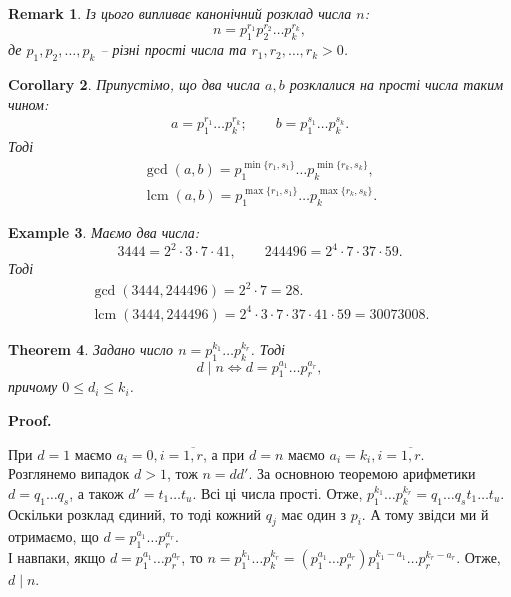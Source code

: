 \documentclass[a4paper, 10pt]{article}
\makeatletter
\theoremstyle{theoremdd}
\newtheorem{theorem}{Theorem}[subsection]
\theoremstyle{theoremdd}
\theoremstyle{theoremdd}
\theoremstyle{theoremdd}
\newtheorem{example}[theorem]{Example}
\theoremstyle{theoremdd}
\theoremstyle{theoremdd}
\newtheorem{remark}[theorem]{Remark}
\theoremstyle{theoremdd}
\theoremstyle{theoremdd}
\newtheorem{corollary}[theorem]{Corollary}
\renewenvironment{proof}[1][Proof.\\]{\par
\pushQED{\hfill \qed}%
\normalfont \topsep6\p@\@plus6\p@\relax
\trivlist
\item\relax
{\bfseries
#1\@addpunct{.}}\hspace\labelsep\ignorespaces
}{%
\popQED\endtrivlist\@endpefalse
}
\DeclareMathOperator{\lcm}{lcm}
\makeatother
\begin{document}
\begin{remark}
Із цього випливає канонічний розклад числа $n$:
\begin{equation*}
n = p_1^{r_1} p_2^{r_2} \dots p_k^{r_k},
\end{equation*}
де $p_1, p_2, \dots, p_k$ -- різні прості числа та $r_1,r_2,\dots,r_k > 0$.
\end{remark}

\begin{corollary}
Припустімо, що два числа $a,b$ розклалися на прості числа таким чином:
\begin{align*}
a = p_1^{r_1} \dots p_k^{r_k}; \qquad b = p_1^{s_1} \dots p_k^{s_k}.
\end{align*}
Тоді 
\begin{gather*}
\gcd (a,b) = p_1^{\min \{r_1,s_1\}} \dots p_k^{\min \{r_k,s_k\}}, \\
\lcm(a,b) = p_1^{\max \{r_1,s_1\}} \dots p_k^{\max \{r_k,s_k\}}.
\end{gather*}
\end{corollary}

\begin{example}
Маємо два числа:
\[
3444 = 2^2 \cdot 3 \cdot 7 \cdot 41, \qquad 244496 = 2^4 \cdot 7 \cdot 37 \cdot 59.
\]
Тоді
\begin{gather*}
\gcd(3444, 244496) = 2^2 \cdot 7 = 28.\\
\lcm(3444, 244496) = 2^4 \cdot 3 \cdot 7 \cdot 37 \cdot 41 \cdot 59 = 30073008.
\end{gather*}
\end{example}

\begin{theorem}
Задано число $n = p_1^{k_1} \dots p_k^{k_r}$. Тоді
\[
d \mid n \iff d = p_1^{a_1} \dots p_r^{a_r},
\] причому $0 \leq d_i \leq k_i$.
\end{theorem}

\begin{proof}
При $d = 1$ маємо $a_i = 0, i = \overline{1,r}$, а при $d = n$ маємо $a_i = k_i, i = \overline{1,r}$.\\
Розглянемо випадок $d > 1$, тож $n = dd'$. За основною теоремою арифметики $d = q_1\dots q_s$, а також $d' = t_1 \dots t_u$. Всі ці числа прості. Отже, $p_1^{k_1} \dots p_k^{k_r} = q_1 \dots q_s t_1 \dots t_u$.\\
Оскільки розклад єдиний, то тоді кожний $q_j$ має один з $p_i$. А тому звідси ми й отримаємо, що $d = p_1^{a_1} \dots p_r^{a_r}$.\\
І навпаки, якщо $d = p_1^{a_1} \dots p_r^{a_r}$, то $n = p_1^{k_1} \dots p_k^{k_r} = (p_1^{a_1} \dots p_r^{a_r}) p_1^{k_1 - a_1} \dots p_r^{k_r - a_r}$. Отже, $d \mid n$.
\end{proof}
\end{document}
